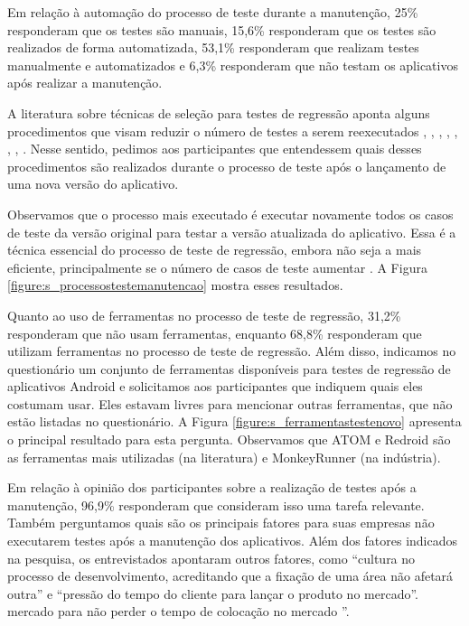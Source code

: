 \begin{enumerate}[label=\bf QP\arabic*]
Em relação à automação do processo de teste durante a manutenção, 25\% responderam que os testes são manuais, 15,6\% responderam que os testes são realizados de forma automatizada, 53,1\% responderam que realizam testes manualmente e automatizados e 6,3\% responderam que não testam os aplicativos após realizar a manutenção.

A literatura sobre técnicas de seleção para testes de regressão aponta alguns procedimentos que visam reduzir o número de testes a serem reexecutados \cite{KAZMI2017}, \cite{ENGSTROM201014}, \cite{Yoo:2012:RTM:2284811.2284813}, \cite{Rothermel2000}, \cite{536955}, \cite{Graves:2001:ESR:367008.367020}, \cite{WHITE1991}, \cite{65194}. Nesse sentido, pedimos aos participantes que entendessem quais desses procedimentos são realizados durante o processo de teste após o lançamento de uma nova versão do aplicativo.

Observamos que o processo mais executado é executar novamente todos os casos de teste da versão original para testar a versão atualizada do aplicativo. Essa é a técnica essencial do processo de teste de regressão, embora não seja a mais eficiente, principalmente se o número de casos de teste aumentar \cite{RothermelGreggHarroldMary2000}. A Figura \ref{figure:s_processostestemanutencao} mostra esses resultados.


Quanto ao uso de ferramentas no processo de teste de regressão, 31,2\% responderam que não usam ferramentas, enquanto 68,8\% responderam que utilizam ferramentas no processo de teste de regressão. Além disso, indicamos no questionário um conjunto de ferramentas disponíveis para testes de regressão de aplicativos Android e solicitamos aos participantes que indiquem quais eles costumam usar. Eles estavam livres para mencionar outras ferramentas, que não estão listadas no questionário. A Figura \ref{figure:s_ferramentastestenovo} apresenta o principal resultado para esta pergunta. Observamos que ATOM e Redroid são as ferramentas mais utilizadas (na literatura) e MonkeyRunner (na indústria).

Em relação à opinião dos participantes sobre a realização de testes após a manutenção, 96,9\% responderam que consideram isso uma tarefa relevante. Também perguntamos quais são os principais fatores para suas empresas não executarem testes após a manutenção dos aplicativos. Além dos fatores indicados na pesquisa, os entrevistados apontaram outros fatores, como “cultura no processo de desenvolvimento, acreditando que a fixação de uma área não afetará outra” e “pressão do tempo do cliente para lançar o produto no mercado”. mercado para não perder o tempo de colocação no mercado ”.


\end{enumerate}
